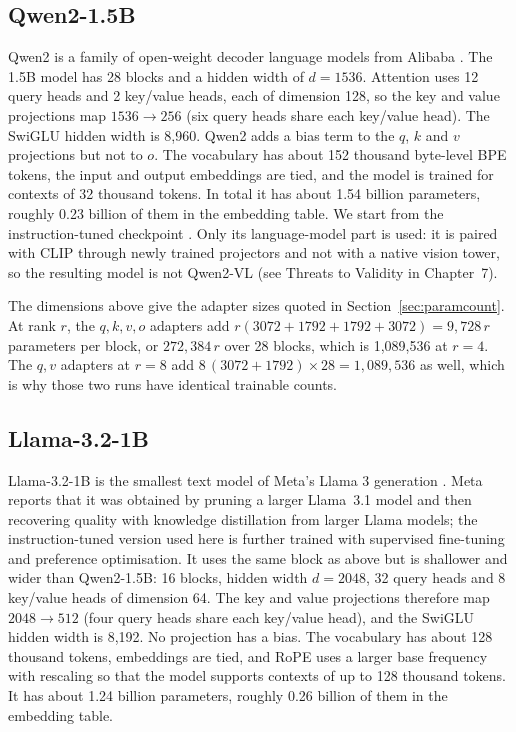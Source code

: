 \documentclass[12pt]{report}
\begin{document}
\subsection{Qwen2-1.5B}
\label{sec:qwen2arch}
Qwen2 is a family of open-weight decoder language models from Alibaba \cite{yang2024qwen2}. The 1.5B model has 28 blocks and a hidden width of $d=1536$. Attention uses 12 query heads and 2 key/value heads, each of dimension 128, so the key and value projections map $1536\to256$ (six query heads share each key/value head). The SwiGLU hidden width is 8,960. Qwen2 adds a bias term to the $q$, $k$ and $v$ projections but not to $o$. The vocabulary has about 152 thousand byte-level BPE tokens, the input and output embeddings are tied, and the model is trained for contexts of 32 thousand tokens. In total it has about 1.54 billion parameters, roughly 0.23 billion of them in the embedding table. We start from the instruction-tuned checkpoint \cite{mithan}. Only its language-model part is used: it is paired with CLIP through newly trained projectors and not with a native vision tower, so the resulting model is not Qwen2-VL \cite{wang2024} (see Threats to Validity in Chapter~7).

The dimensions above give the adapter sizes quoted in Section~\ref{sec:paramcount}. At rank $r$, the $q,k,v,o$ adapters add $r(3072+1792+1792+3072)=9{,}728\,r$ parameters per block, or $272{,}384\,r$ over 28 blocks, which is 1,089,536 at $r=4$. The $q,v$ adapters at $r=8$ add $8\,(3072+1792)\times28=1{,}089{,}536$ as well, which is why those two runs have identical trainable counts.

\subsection{Llama-3.2-1B}
\label{sec:llamaarch}
Llama-3.2-1B is the smallest text model of Meta's Llama 3 generation \cite{llama32,grattafiori2024llama3}. Meta reports that it was obtained by pruning a larger Llama~3.1 model and then recovering quality with knowledge distillation from larger Llama models; the instruction-tuned version used here is further trained with supervised fine-tuning and preference optimisation. It uses the same block as above but is shallower and wider than Qwen2-1.5B: 16 blocks, hidden width $d=2048$, 32 query heads and 8 key/value heads of dimension 64. The key and value projections therefore map $2048\to512$ (four query heads share each key/value head), and the SwiGLU hidden width is 8,192. No projection has a bias. The vocabulary has about 128 thousand tokens, embeddings are tied, and RoPE uses a larger base frequency with rescaling so that the model supports contexts of up to 128 thousand tokens. It has about 1.24 billion parameters, roughly 0.26 billion of them in the embedding table.
\end{document}
